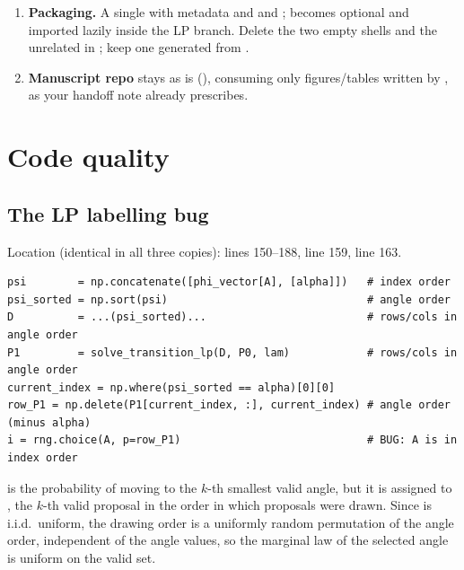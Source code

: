\documentclass[11pt,a4paper]{article}
\theoremstyle{remark}
\begin{document}
\begin{enumerate}[leftmargin=*]
\item \textbf{Packaging.} A single  with \code{[project]} metadata and  and ;  becomes optional and imported lazily inside the LP branch. Delete the two empty  shells and the unrelated  in ; keep one  generated from .
\item \textbf{Manuscript repo} stays as is (), consuming only figures/tables written by , as your handoff note already prescribes.
\end{enumerate}

\section{Code quality}\label{sec:code}
\subsection{The LP labelling bug}\label{sec:lpbug}
Location (identical in all three copies):  lines 150--188,  line 159,  line 163.
\begin{lstlisting}
psi        = np.concatenate([phi_vector[A], [alpha]])   # index order
psi_sorted = np.sort(psi)                               # angle order
D          = ...(psi_sorted)...                         # rows/cols in angle order
P1         = solve_transition_lp(D, P0, lam)            # rows/cols in angle order
current_index = np.where(psi_sorted == alpha)[0][0]
row_P1 = np.delete(P1[current_index, :], current_index) # angle order (minus alpha)
i = rng.choice(A, p=row_P1)                             # BUG: A is in index order
\end{lstlisting}
 is the probability of moving to the $k$-th smallest valid angle, but it is assigned to , the $k$-th valid proposal in the order in which proposals were drawn. Since  is i.i.d.\ uniform, the drawing order is a uniformly random permutation of the angle order, independent of the angle values, so the marginal law of the selected angle is uniform on the valid set.
\end{document}
